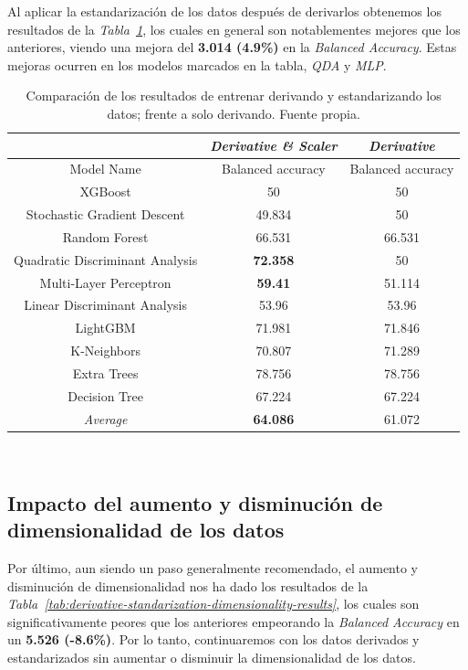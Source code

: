 Al aplicar la estandarización de los datos después de derivarlos obtenemos los resultados de la \textit{Tabla\ \ref{tab:derivative-standarization-results}}, los cuales en general son notablementes mejores que los anteriores, viendo una mejora del \textbf{3.014 (4.9\%)} en la \textit{Balanced Accuracy}. Estas mejoras ocurren en los modelos marcados en la tabla, \textit{QDA} y \textit{MLP}.


\begin{table}[!h]
    \centering
    \begin{tabular}{|c|c|c|}
        \hline
        & \textit{Derivative \& Scaler} & \textit{Derivative} \\ \hline
        Model Name & Balanced accuracy & Balanced accuracy \\ \hline
        XGBoost & 50 & 50 \\
        Stochastic Gradient Descent & 49.834 & 50 \\ 
        Random Forest & 66.531 & 66.531 \\ 
        Quadratic Discriminant Analysis & \textbf{72.358} & 50 \\ 
        Multi-Layer Perceptron & \textbf{59.41} & 51.114 \\ 
        Linear Discriminant Analysis & 53.96 & 53.96 \\ 
        LightGBM & 71.981 & 71.846 \\ 
        K-Neighbors & 70.807 & 71.289 \\ 
        Extra Trees & 78.756 & 78.756 \\ 
        Decision Tree & 67.224 & 67.224 \\ \hline
        \textit{Average} & \textbf{64.086} & 61.072 \\ \hline
    \end{tabular}
    \caption{Comparación de los resultados de entrenar derivando y estandarizando los datos; frente a solo derivando. Fuente propia.}\ \label{tab:derivative-standarization-results}
\end{table}


\subsection{Impacto del aumento y disminución de dimensionalidad de los datos}


Por último, aun siendo un paso generalmente recomendado, el aumento y disminución de dimensionalidad nos ha dado los resultados de la \textit{Tabla\ \ref{tab:derivative-standarization-dimensionality-results}}, los cuales son significativamente peores que los anteriores empeorando la \textit{Balanced Accuracy} en un \textbf{5.526 (-8.6\%)}. Por lo tanto, continuaremos con los datos derivados y estandarizados sin aumentar o disminuir la dimensionalidad de los datos.

